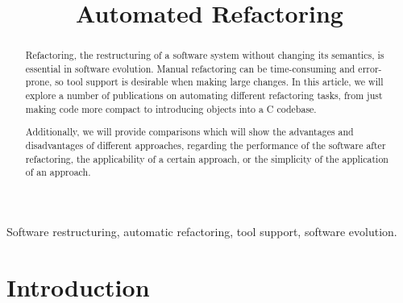 \documentclass[conference,compsoc,a4paper]{IEEEtran}
\begin{document}
	
	\title{Automated Refactoring}
	\author{
		\and
	}
	
	\maketitle
	
	
	\begin{abstract}
		Refactoring, the restructuring of a software system without changing its semantics, is essential in software evolution. 
		Manual refactoring can be time-consuming and error-prone, so tool support is desirable when making large changes. In 
		this article, we will explore a number of publications on automating different refactoring tasks, from just making code 
		more compact to introducing objects into a C codebase.
		
		Additionally, we will provide comparisons which will show the advantages and disadvantages of different approaches, 
		regarding the performance of the software after refactoring, the applicability of a certain approach, or the simplicity 
		of the application of an approach.
		
		
	\end{abstract}
	
	\begin{IEEEkeywords}
		Software restructuring, automatic refactoring, tool support, software evolution.
	\end{IEEEkeywords}
	
	\IEEEpeerreviewmaketitle
	
	
	\section{Introduction}
	
\end{document}
